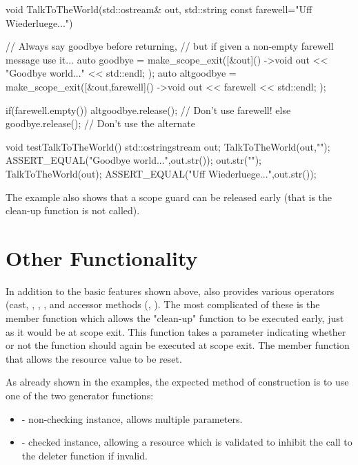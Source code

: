 \documentclass[ebook,11pt,article]{memoir}
\begin{document}
\begin{codeblock}
void TalkToTheWorld(std::ostream& out, std::string const farewell="Uff Wiederluege...")
{
	// Always say goodbye before returning,
	// but if given a non-empty farewell message use it...
	auto goodbye = make_scope_exit([&out]() ->void
	{
		out << "Goodbye world..." << std::endl;
	});
	auto altgoodbye = make_scope_exit([&out,farewell]() ->void
	{
		out << farewell << std::endl;
	});


	if(farewell.empty())
	{
		altgoodbye.release();		// Don't use farewell!
	}
	else
	{
		goodbye.release();	// Don't use the alternate
	}
}
\end{codeblock}
\begin{codeblock}

void testTalkToTheWorld(){
	std::ostringstream out;
	TalkToTheWorld(out,"");
	ASSERT_EQUAL("Goodbye world...\n",out.str());
	out.str("");
	TalkToTheWorld(out);
	ASSERT_EQUAL("Uff Wiederluege...\n",out.str());
}
\end{codeblock}
The example also shows that a scope guard can be released early (that is the clean-up function is not called).

\section{Other Functionality}
In addition to the basic features shown above,  also provides various operators (cast, \tcode{->}, \tcode{()}, \tcode{*}, and accessor methods (, ).  The most complicated of these is the  member function which allows the "clean-up" function to be executed early, just as it would be at scope exit.  This function takes a parameter indicating whether or not the function should again be executed at scope exit.  The  member function that allows the resource value to be reset.

As already shown in the examples, the expected method of construction is to use one of the two generator functions:
\begin{itemize}
\item {} - non-checking instance, allows multiple parameters.
\item {} - checked instance, allowing a resource which is validated to inhibit the call to the deleter function if invalid.
\end{itemize}
\end{document}
